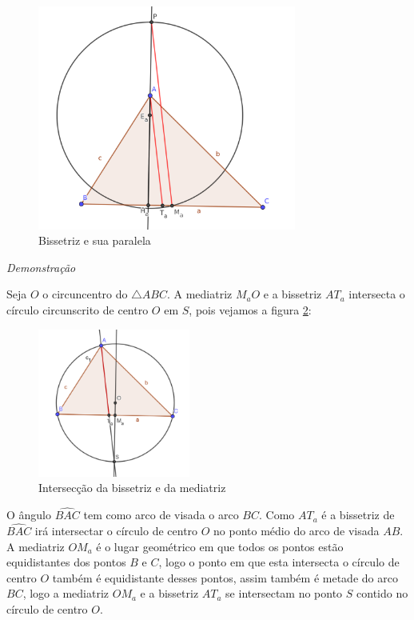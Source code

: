 \documentclass[12pt, openright, a4paper, brazil, openany, oneside]{abntex2}
\begin{document}
\begin{figure}[h]
	
	\center
	
	\includegraphics[width=8.5cm]{trianguloteo.png}
	\caption{Bissetriz e sua paralela \label{triateo}}
	
\end{figure}

\textit{Demonstração}

Seja $O$ o circuncentro do $\triangle ABC$. A mediatriz $M_{a}O$ e a bissetriz $AT_a$ intersecta o círculo circunscrito de centro $O$ em $S$, pois vejamos a figura \ref{trianbismed}:

\begin{figure}[h]
	
	\center
	
	\includegraphics[width=5cm]{triangulocirc.png}
	\caption{Intersecção da bissetriz e da mediatriz\label{trianbismed}}
	
\end{figure}

O ângulo $\hat{BAC}$ tem como arco de visada o arco $BC$. Como $AT_a$ é a bissetriz de $\hat{BAC}$ irá intersectar o círculo de centro $O$ no ponto médio do arco de visada $AB$. A mediatriz $OM_a$ é o lugar geométrico em que todos os pontos estão equidistantes dos pontos $B$ e $C$, logo o ponto em que esta intersecta o círculo de centro $O$ também é equidistante desses pontos, assim também é metade do arco $BC$, logo a mediatriz $OM_a$ e a bissetriz $AT_a$ se intersectam no ponto $S$ contido no círculo de centro $O$.
\end{document}
